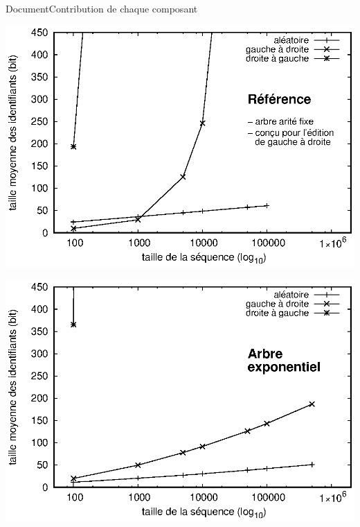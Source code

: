 \begin{frame}{Document}{Contribution de chaque composant}
  
  \hspace{-1cm}
  \begin{minipage}{0.45\textwidth}
    \includegraphics[width=1.25\textwidth]{img/replication/logoot.eps}
  \end{minipage}
  \hspace{1.5cm}
  \begin{minipage}{0.45\textwidth}
      {\includegraphics[width=1.25\textwidth]{img/replication/double.eps}}%
  \end{minipage}
  

\end{frame}

